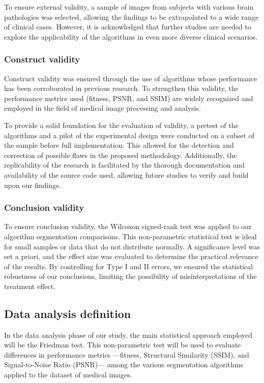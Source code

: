 \documentclass{elsarticle}
\begin{document}
To ensure external validity, a sample of images from subjects with various brain pathologies was selected, allowing the findings to be extrapolated to a wide range of clinical cases. However, it is acknowledged that further studies are needed to explore the applicability of the algorithms in even more diverse clinical scenarios.

\subsubsection{Construct validity}

Construct validity was ensured through the use of algorithms whose performance has been corroborated in previous research. To strengthen this validity, the performance metrics used (fitness, PSNR, and SSIM) are widely recognized and employed in the field of medical image processing and analysis.

To provide a solid foundation for the evaluation of validity, a pretest of the algorithms and a pilot of the experimental design were conducted on a subset of the sample before full implementation. This allowed for the detection and correction of possible flaws in the proposed methodology. Additionally, the replicability of the research is facilitated by the thorough documentation and availability of the source code used, allowing future studies to verify and build upon our findings.

\subsubsection{Conclusion validity}

To ensure conclusion validity, the Wilcoxon signed-rank test was applied to our algorithm segmentation comparisons. This non-parametric statistical test is ideal for small samples or data that do not distribute normally. A significance level was set a priori, and the effect size was evaluated to determine the practical relevance of the results. By controlling for Type I and II errors, we ensured the statistical robustness of our conclusions, limiting the possibility of misinterpretations of the treatment effect.

\subsection{Data analysis definition}

In the data analysis phase of our study, the main statistical approach employed will be the Friedman test. This non-parametric test will be used to evaluate differences in performance metrics —fitness, Structural Similarity (SSIM), and Signal-to-Noise Ratio (PSNR)— among the various segmentation algorithms applied to the dataset of medical images.
\end{document}
